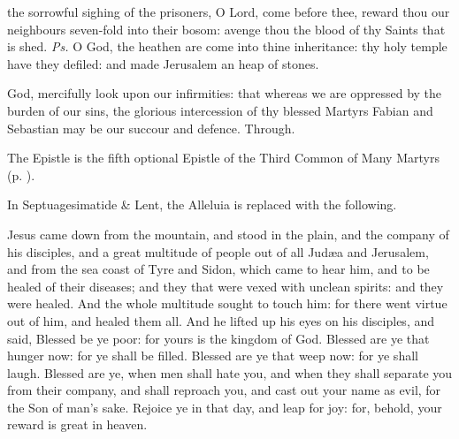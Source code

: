 \introit
{} the sorrowful sighing of the prisoners, O Lord, come before thee, reward thou our neighbours seven-fold into their bosom: avenge thou the blood of thy Saints that is shed. \textit{Ps.} O God, the heathen are come into thine inheritance: thy holy temple have they defiled: and made Jerusalem an heap of stones.

\collect
{} God, mercifully look upon our infirmities: that whereas we are oppressed by the burden of our sins, the glorious intercession of thy blessed Martyrs Fabian and Sebastian may be our succour and defence. Through.

\begin{rubric}
	The Epistle is the fifth optional Epistle of the Third Common of Many Martyrs (p. \pageref{Hebrews1133}).
\end{rubric}


\begin{rubric}
	In Septuagesimatide \& Lent, the Alleluia is replaced with the following.
\end{rubric}


 Jesus came down from the mountain, and stood in the plain, and the company of his disciples, and a great multitude of people out of all Jud{\ae}a and Jerusalem, and from the sea coast of Tyre and Sidon, which came to hear him, and to be healed of their diseases; and they that were vexed with unclean spirits: and they were healed. And the whole multitude sought to touch him: for there went virtue out of him, and healed them all. And he lifted up his eyes on his disciples, and said, Blessed be ye poor: for yours is the kingdom of God. Blessed are ye that hunger now: for ye shall be filled. Blessed are ye that weep now: for ye shall laugh. Blessed are ye, when men shall hate you, and when they shall separate you from their company, and shall reproach you, and cast out your name as evil, for the Son of man’s sake. Rejoice ye in that day, and leap for joy: for, behold, your reward is great in heaven.

